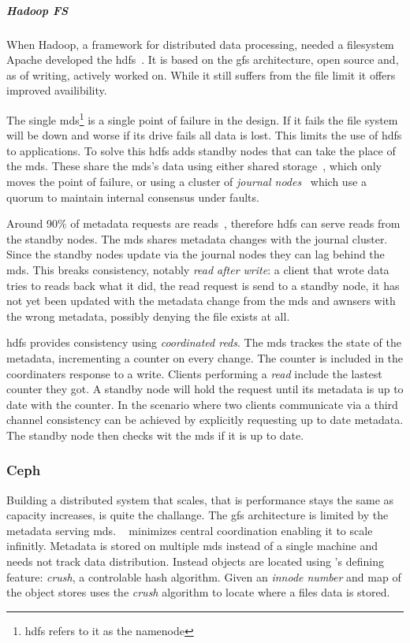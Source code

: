 \subparagraph*{Hadoop FS}
When Hadoop, a framework for distributed data processing, needed a filesystem Apache developed the \ac{hdfs}~\cite{hdfs}. It is based on the \ac{gfs} architecture, open source and, as of writing, actively worked on. While it still suffers from the file limit it offers improved availibility.

The single \ac{mds}\footnote{\ac{hdfs} refers to it as the namenode} is a single point of failure in the design. If it fails the file system will be down and worse if its drive fails all data is lost. This limits the use of \ac{hdfs} to applications. To solve this \ac{hdfs} adds standby nodes that can take the place of the \ac{mds}. These share the \ac{mds}'s data using either shared storage~\cite{hdfs_ha_nfs}, which only moves the point of failure, or using a cluster of \textit{journal nodes}~\cite{hdfs_ha_q} which use a quorum to maintain internal consensus under faults. 

Around 90\% of metadata requests are reads~\cite{hdfs_ha_reads}, therefore \ac{hdfs} can serve reads from the standby nodes. The \ac{mds} shares metadata changes with the journal cluster. Since the standby nodes update via the journal nodes they can lag behind the \ac{mds}. This breaks consistency, notably \textit{read after write}: a client that wrote data tries to reads back what it did, the read request is send to a standby node, it has not yet been updated with the metadata change from the \ac{mds} and awnsers with the wrong metadata, possibly denying the file exists at all. 

\ac{hdfs} provides consistency using \textit{coordinated reds}. The \ac{mds} trackes the state of the metadata, incrementing a counter on every change. The counter is included in the coordinaters response to a write. Clients performing a \textit{read} include the lastest counter they got. A standby node will hold the request until its metadata is up to date with the counter. In the scenario where two clients communicate via a third channel consistency can be achieved by explicitly requesting up to date metadata. The standby node then checks wit the \ac{mds} if it is up to date.

\subsubsection*{Ceph}
Building a distributed system that scales, that is performance stays the same as capacity increases, is quite the challange. The \ac{gfs} architecture is limited by the metadata serving \acf{mds}. \ceph{}~\cite{ceph} minimizes central coordination enabling it to scale infinitly. Metadata is stored on multiple \ac{mds} instead of a single machine and needs not track data distribution. Instead objects are located using \ceph{}'s defining feature: \emph{\ac{crush}}, a controlable hash algorithm. Given an \textit{innode number} and map of the object stores \ceph{} uses the \emph{\ac{crush}} algorithm to locate where a files data is stored. 

